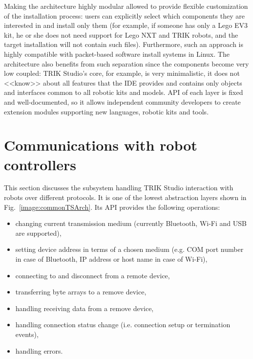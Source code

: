 \documentclass[conference]{IEEEtran}
\begin{document}
Making the architecture highly modular allowed to provide flexible customization of the installation process: users can explicitly select which components they are interested in and install only them (for example, if someone has only a Lego EV3 kit, he or she does not need support for Lego NXT and TRIK robots, and the target installation will not contain such files). Furthermore, such an approach is highly compatible with packet-based software install systems in Linux. The architecture also benefits from such separation since the components become very low coupled: TRIK Studio's core, for example, is very minimalistic, it does not <<know>> about all features that the IDE provides and contains only objects and interfaces common to all robotic kits and models. API of each layer is fixed and well-documented, so it allows independent community developers to create extension modules supporting new languages, robotic kits and tools.

\section{Communications with robot controllers}
\label{chapter:communications}

This section discusses the subsystem handling TRIK Studio interaction with robots over different protocols. It is one of the lowest abstraction layers shown in Fig.~\ref{image:commonTSArch}. Its API provides the following operations: 

\begin{itemize}
    \item changing current transmission medium (currently Bluetooth, Wi-Fi and USB are supported),
    \item setting device address in terms of a chosen medium (e.g. COM port number in case of Bluetooth, IP address or host name in case of Wi-Fi),
    \item connecting to and disconnect from a remote device,
    \item transferring byte arrays to a remove device,
    \item handling receiving data from a remove device,
    \item handling connection status change (i.e. connection setup or termination events),
    \item handling errors.
\end{itemize}
\end{document}
